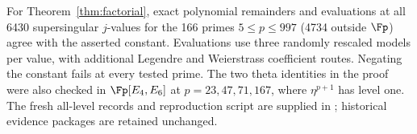 For Theorem~\ref{thm:factorial}, exact polynomial remainders and evaluations
at all 6430 supersingular $j$-values for the 166 primes $5\le p\le997$
(4734 outside $\Fp$) agree with the asserted constant. Evaluations use three
randomly rescaled models per value, with additional Legendre and Weierstrass
coefficient routes. Negating the constant fails at every tested prime.
The two theta identities in the proof were also checked in
$\Fp[E_4,E_6]$ at $p=23,47,71,167$, where $\eta^{p+1}$ has level one.
The fresh all-level records and reproduction script are supplied in
; historical evidence
packages are retained unchanged.

